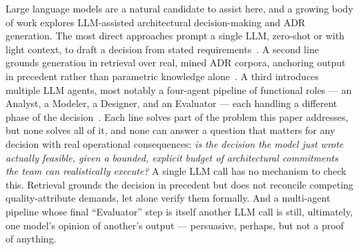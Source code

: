\documentclass[preprint,12pt,authoryear]{elsarticle}
\renewcommand{\_}{\textunderscore\allowbreak{}}
\begin{document}
Large language models are a natural candidate to assist here, and a growing body of work explores LLM-assisted architectural decision-making and ADR generation. The most direct approaches prompt a single LLM, zero-shot or with light context, to draft a decision from stated requirements~\citep{dhar2024llm}. A second line grounds generation in retrieval over real, mined ADR corpora, anchoring output in precedent rather than parametric knowledge alone~\citep{contextmatters2026}. A third introduces multiple LLM agents, most notably a four-agent pipeline of functional roles --- an Analyst, a Modeler, a Designer, and an Evaluator --- each handling a different phase of the decision~\citep{maad2025}. Each line solves part of the problem this paper addresses, but none solves all of it, and none can answer a question that matters for any decision with real operational consequences: \emph{is the decision the model just wrote actually feasible, given a bounded, explicit budget of architectural commitments the team can realistically execute?} A single LLM call has no mechanism to check this. Retrieval grounds the decision in precedent but does not reconcile competing quality-attribute demands, let alone verify them formally. And a multi-agent pipeline whose final ``Evaluator'' step is itself another LLM call is still, ultimately, one model's opinion of another's output --- persuasive, perhaps, but not a proof of anything.
\end{document}
